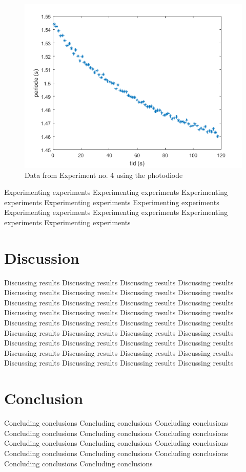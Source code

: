 \documentclass[%
 reprint,
 amsmath,amssymb,
 aps,
]{revtex4-1}
\begin{document}
    \begin{figure}[h!]
    	\center
    	\includegraphics[scale=0.6]{forsok4fig1}
    	\caption{Data from Experiment no. 4 using the photodiode}
    \end{figure}
  	
  	Experimenting experiments Experimenting experiments Experimenting experiments Experimenting experiments Experimenting experiments Experimenting experiments Experimenting experiments Experimenting experiments Experimenting experiments 


\section{Discussion}
	Discussing results Discussing results Discussing results Discussing results Discussing results Discussing results Discussing results Discussing results Discussing results Discussing results Discussing results Discussing results Discussing results Discussing results Discussing results Discussing results Discussing results Discussing results Discussing results Discussing results Discussing results Discussing results Discussing results Discussing results Discussing results Discussing results Discussing results Discussing results Discussing results Discussing results Discussing results Discussing results Discussing results Discussing results Discussing results Discussing results 
\section{Conclusion}
	Concluding conclusions Concluding conclusions Concluding conclusions Concluding conclusions Concluding conclusions Concluding conclusions Concluding conclusions Concluding conclusions Concluding conclusions Concluding conclusions Concluding conclusions Concluding conclusions Concluding conclusions Concluding conclusions 


\end{document}
